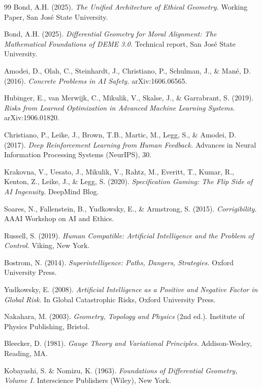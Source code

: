 \documentclass[11pt,letterpaper]{article}
\theoremstyle{definition}
\theoremstyle{remark}
\begin{document}
\begin{thebibliography}{99}
Bond, A.H. (2025). \emph{The Unified Architecture of Ethical Geometry.} Working Paper, San Jos\'e State University.

Bond, A.H. (2025). \emph{Differential Geometry for Moral Alignment: The Mathematical Foundations of DEME 3.0.} Technical report, San Jos\'e State University.

Amodei, D., Olah, C., Steinhardt, J., Christiano, P., Schulman, J., \& Man\'e, D. (2016). \emph{Concrete Problems in AI Safety.} arXiv:1606.06565.

Hubinger, E., van Merwijk, C., Mikulik, V., Skalse, J., \& Garrabrant, S. (2019). \emph{Risks from Learned Optimization in Advanced Machine Learning Systems.} arXiv:1906.01820.

Christiano, P., Leike, J., Brown, T.B., Martic, M., Legg, S., \& Amodei, D. (2017). \emph{Deep Reinforcement Learning from Human Feedback.} Advances in Neural Information Processing Systems (NeurIPS), 30.

Krakovna, V., Uesato, J., Mikulik, V., Rahtz, M., Everitt, T., Kumar, R., Kenton, Z., Leike, J., \& Legg, S. (2020). \emph{Specification Gaming: The Flip Side of AI Ingenuity.} DeepMind Blog.

Soares, N., Fallenstein, B., Yudkowsky, E., \& Armstrong, S. (2015). \emph{Corrigibility.} AAAI Workshop on AI and Ethics.

Russell, S. (2019). \emph{Human Compatible: Artificial Intelligence and the Problem of Control.} Viking, New York.

Bostrom, N. (2014). \emph{Superintelligence: Paths, Dangers, Strategies.} Oxford University Press.

Yudkowsky, E. (2008). \emph{Artificial Intelligence as a Positive and Negative Factor in Global Risk.} In Global Catastrophic Risks, Oxford University Press.

Nakahara, M. (2003). \emph{Geometry, Topology and Physics} (2nd ed.). Institute of Physics Publishing, Bristol.

Bleecker, D. (1981). \emph{Gauge Theory and Variational Principles.} Addison-Wesley, Reading, MA.

Kobayashi, S. \& Nomizu, K. (1963). \emph{Foundations of Differential Geometry, Volume I.} Interscience Publishers (Wiley), New York.


\end{thebibliography}
\end{document}
